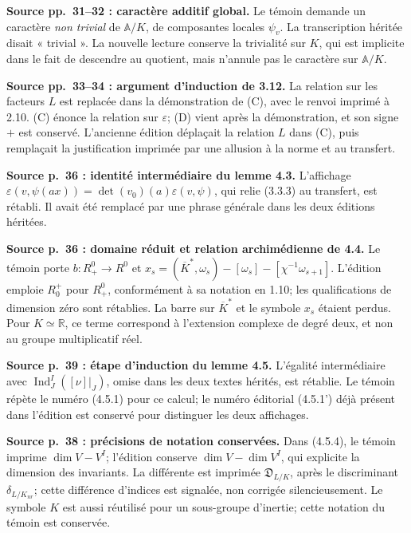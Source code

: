 \documentclass[10pt,letterpaper]{article}
\newcommand{\Ind}{\operatorname{Ind}}
\providecommand{\Ind}{\operatorname{Ind}}
\begin{document}
\begin{description}[style=nextline,leftmargin=2.6em,labelwidth=2.2em,font=\normalfont\bfseries]
\item[E36] \textbf{Source pp.~31--32 : caractère additif global.} Le témoin demande un caractère \emph{non trivial} de \(\mathbb A/K\), de composantes locales \(\psi_v\). La transcription héritée disait « trivial ». La nouvelle lecture conserve la trivialité sur \(K\), qui est implicite dans le fait de descendre au quotient, mais n'annule pas le caractère sur \(\mathbb A/K\).
\item[E37] \textbf{Source pp.~33--34 : argument d'induction de 3.12.} La relation sur les facteurs \(L\) est replacée dans la démonstration de (C), avec le renvoi imprimé à 2.10. (C) énonce la relation sur \(\varepsilon\); (D) vient après la démonstration, et son signe \(+\) est conservé. L'ancienne édition déplaçait la relation \(L\) dans (C), puis remplaçait la justification imprimée par une allusion à la norme et au transfert.
\pagebreak
\item[E38] \textbf{Source p.~36 : identité intermédiaire du lemme 4.3.} L'affichage \(\varepsilon(v,\psi(ax))=\det(v_0)(a)\varepsilon(v,\psi)\), qui relie (3.3.3) au transfert, est rétabli. Il avait été remplacé par une phrase générale dans les deux éditions héritées.
\item[E39] \textbf{Source p.~36 : domaine réduit et relation archimédienne de 4.4.} Le témoin porte \(b:R^0_+\to R^0\) et \(x_s=(\overline K^*,\omega_s)-[\omega_s]-[\chi^{-1}\omega_{s+1}]\). L'édition emploie \(R^+_0\) pour \(R^0_+\), conformément à sa notation en 1.10; les qualifications de dimension zéro sont rétablies. La barre sur \(\overline K^*\) et le symbole \(x_s\) étaient perdus. Pour \(K\simeq\mathbb R\), ce terme correspond à l'extension complexe de degré deux, et non au groupe multiplicatif réel.
\item[E40] \textbf{Source p.~39 : étape d'induction du lemme 4.5.}
L'égalité intermédiaire avec
\(\Ind_J^I([\nu]|_J)\), omise dans les deux textes hérités, est rétablie.
Le témoin répète le numéro (4.5.1) pour ce calcul; le numéro éditorial
(4.5.1') déjà présent dans l'édition est conservé pour distinguer les deux affichages.

\item[E41] \textbf{Source p.~38 : précisions de notation conservées.}
Dans (4.5.4), le témoin imprime \(\dim V-V^I\); l'édition conserve
\(\dim V-\dim V^I\), qui explicite la dimension des invariants.
La différente est imprimée \(\mathfrak D_{L/K}\), après le discriminant
\(\delta_{L/K_{nr}}\); cette différence d'indices est signalée, non corrigée silencieusement.
Le symbole \(K\) est aussi réutilisé pour un sous-groupe d'inertie; cette notation du témoin est conservée.


\end{description}
\end{document}
